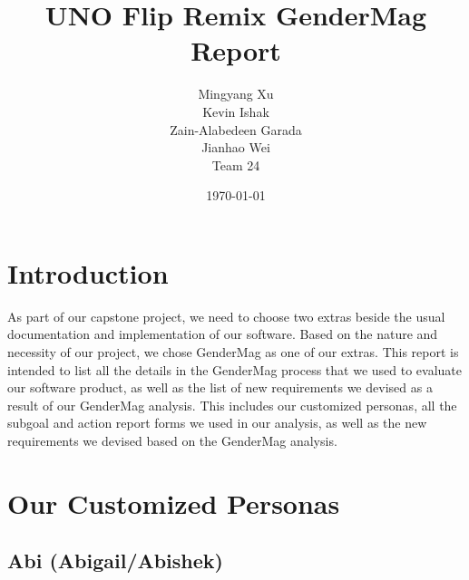 \documentclass[12pt, titlepage]{article}
\begin{document}
\title{UNO Flip Remix GenderMag Report}
\author{Mingyang Xu\\ Kevin Ishak\\ Zain-Alabedeen Garada\\ Jianhao Wei\\ Team 24}

\date{\today}

\maketitle


\tableofcontents


\newpage


\section{Introduction}
As part of our capstone project, we need to choose two extras beside the usual documentation and implementation of our software. Based on the nature and necessity of our project, we chose GenderMag as one of our extras. This report is intended to list all the details in the GenderMag process that we used to evaluate our software product, as well as the list of new requirements we devised as a result of our GenderMag analysis. This includes our customized personas, all the subgoal and action report forms we used in our analysis, as well as the new requirements we devised based on the GenderMag analysis.

\section{Our Customized Personas}
\subsection{Abi (Abigail/Abishek)}
\end{document}
